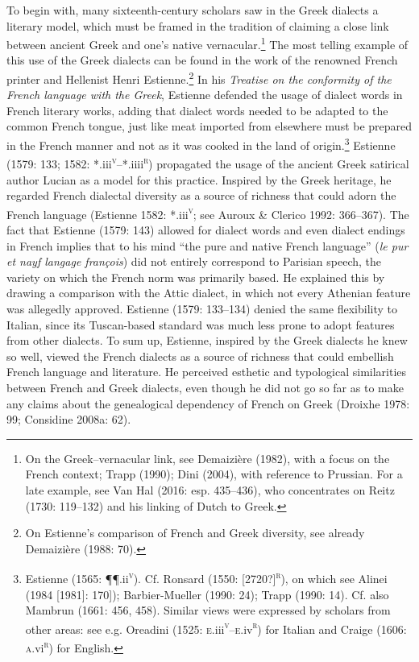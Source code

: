 \documentclass[12pt]{article}
\newenvironment{styleStandard}{\renewcommand\baselinestretch{1.25}\setlength\leftskip{0in}\setlength\rightskip{0in}\setlength\parindent{0.1972in}\setlength\parfillskip{0pt plus 1fil}\setlength\parskip{0in plus 1pt}\writerlistparindent\writerlistleftskip\leavevmode\normalfont\normalsize\writerlistlabel\ignorespaces}{\unskip\vspace{0in plus 1pt}\par}
\newcommand\writerlistleftskip{}
\newcommand\writerlistparindent{}
\newcommand\writerlistlabel{}
\begin{document}
\begin{styleStandard}
To begin with, many sixteenth-century scholars saw in the Greek dialects a literary model, which must be framed in the tradition of claiming a close link between ancient Greek and one’s native vernacular.\footnote{ On the Greek–vernacular link, see Demaizière (1982), with a focus on the French context; Trapp (1990); Dini (2004), with reference to Prussian. For a late example, see Van Hal (2016: esp. 435–436), who concentrates on Reitz (1730: 119–132) and his linking of Dutch to Greek.} The most telling example of this use of the Greek dialects can be found in the work of the renowned French printer and Hellenist Henri Estienne.\footnote{ On Estienne’s comparison of French and Greek diversity, see already Demaizière (1988: 70).} In his \textit{Treatise on the conformity of the French language with the Greek},\textit{ }Estienne defended the usage of dialect words in French literary works, adding that dialect words needed to be adapted to the common French tongue, just like meat imported from elsewhere must be prepared in the French manner and not as it was cooked in the land of origin.\footnote{ Estienne (1565: ¶¶.ii\textsc{\textsuperscript{v}}). Cf. Ronsard (1550: [2720?]\textsc{\textsuperscript{r}}), on which see Alinei (1984 [1981]: 170]); Barbier-Mueller (1990: 24); Trapp (1990: 14). Cf. also Mambrun (1661: 456, 458). Similar views were expressed by scholars from other areas: see e.g. Oreadini (1525: \textsc{e.}iii\textsc{\textsuperscript{v}}–\textsc{e.}iv\textsc{\textsuperscript{r}}) for Italian and Craige (1606: \textsc{a}.vi\textsc{\textsuperscript{r}}) for English.} Estienne (1579: 133; 1582: *.iii\textsc{\textsuperscript{v}}–*.iiii\textsc{\textsuperscript{r}}) propagated the usage of the ancient Greek satirical author Lucian as a model for this practice. Inspired by the Greek heritage, he regarded French dialectal diversity as a source of richness that could adorn the French language (Estienne 1582: *.iii\textsc{\textsuperscript{v}}; see Auroux \& Clerico 1992: 366–367). The fact that Estienne (1579: 143) allowed for dialect words and even dialect endings in French implies that to his mind “the pure and native French language” (\textit{le pur et nayf langage françois}) did not entirely correspond to Parisian speech, the variety on which the French norm was primarily based. He explained this by drawing a comparison with the Attic dialect, in which not every Athenian feature was allegedly approved. Estienne (1579: 133–134) denied the same flexibility to Italian, since its Tuscan-based standard was much less prone to adopt features from other dialects. To sum up, Estienne, inspired by the Greek dialects he knew so well, viewed the French dialects as a source of richness that could embellish French language and literature. He perceived esthetic and typological similarities between French and Greek dialects, even though he did not go so far as to make any claims about the genealogical dependency of French on Greek (Droixhe 1978: 99; Considine 2008a: 62).
\end{styleStandard}
\end{document}
